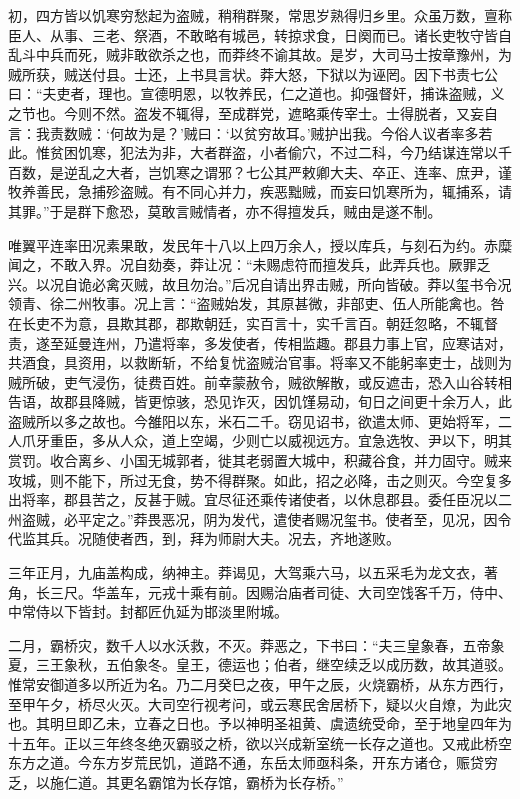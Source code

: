 \documentclass[12pt,UTF8]{ctexbook}
\begin{document}
初，四方皆以饥寒穷愁起为盗贼，稍稍群聚，常思岁熟得归乡里。众虽万数，亶称臣人、从事、三老、祭酒，不敢略有城邑，转掠求食，日阕而已。诸长吏牧守皆自乱斗中兵而死，贼非敢欲杀之也，而莽终不谕其故。是岁，大司马士按章豫州，为贼所获，贼送付县。士还，上书具言状。莽大怒，下狱以为诬罔。因下书责七公曰：“夫吏者，理也。宣德明恩，以牧养民，仁之道也。抑强督奸，捕诛盗贼，义之节也。今则不然。盗发不辄得，至成群党，遮略乘传宰士。士得脱者，又妄自言：我责数贼：‘何故为是？’贼曰：‘以贫穷故耳。’贼护出我。今俗人议者率多若此。惟贫困饥寒，犯法为非，大者群盗，小者偷穴，不过二科，今乃结谋连常以千百数，是逆乱之大者，岂饥寒之谓邪？七公其严敕卿大夫、卒正、连率、庶尹，谨牧养善民，急捕殄盗贼。有不同心并力，疾恶黜贼，而妄曰饥寒所为，辄捕系，请其罪。”于是群下愈恐，莫敢言贼情者，亦不得擅发兵，贼由是遂不制。



唯翼平连率田况素果敢，发民年十八以上四万余人，授以库兵，与刻石为约。赤糜闻之，不敢入界。况自劾奏，莽让况：“未赐虑符而擅发兵，此弄兵也。厥罪乏兴。以况自诡必禽灭贼，故且勿治。”后况自请出界击贼，所向皆破。莽以玺书令况领青、徐二州牧事。况上言：“盗贼始发，其原甚微，非部吏、伍人所能禽也。咎在长吏不为意，县欺其郡，郡欺朝廷，实百言十，实千言百。朝廷忽略，不辄督责，遂至延曼连州，乃遣将率，多发使者，传相监趣。郡县力事上官，应寒诘对，共酒食，具资用，以救断斩，不给复忧盗贼治官事。将率又不能躬率吏士，战则为贼所破，吏气浸伤，徒费百姓。前幸蒙赦令，贼欲解散，或反遮击，恐入山谷转相告语，故郡县降贼，皆更惊骇，恐见诈灭，因饥馑易动，旬日之间更十余万人，此盗贼所以多之故也。今雒阳以东，米石二千。窃见诏书，欲遣太师、更始将军，二人爪牙重臣，多从人众，道上空竭，少则亡以威视远方。宜急选牧、尹以下，明其赏罚。收合离乡、小国无城郭者，徙其老弱置大城中，积藏谷食，并力固守。贼来攻城，则不能下，所过无食，势不得群聚。如此，招之必降，击之则灭。今空复多出将率，郡县苦之，反甚于贼。宜尽征还乘传诸使者，以休息郡县。委任臣况以二州盗贼，必平定之。”莽畏恶况，阴为发代，遣使者赐况玺书。使者至，见况，因令代监其兵。况随使者西，到，拜为师尉大夫。况去，齐地遂败。



三年正月，九庙盖构成，纳神主。莽谒见，大驾乘六马，以五采毛为龙文衣，著角，长三尺。华盖车，元戎十乘有前。因赐治庙者司徒、大司空饯客千万，侍中、中常侍以下皆封。封都匠仇延为邯淡里附城。



二月，霸桥灾，数千人以水沃救，不灭。莽恶之，下书曰：“夫三皇象春，五帝象夏，三王象秋，五伯象冬。皇王，德运也；伯者，继空续乏以成历数，故其道驳。惟常安御道多以所近为名。乃二月癸巳之夜，甲午之辰，火烧霸桥，从东方西行，至甲午夕，桥尽火灭。大司空行视考问，或云寒民舍居桥下，疑以火自燎，为此灾也。其明旦即乙未，立春之日也。予以神明圣祖黄、虞遗统受命，至于地皇四年为十五年。正以三年终冬绝灭霸驳之桥，欲以兴成新室统一长存之道也。又戒此桥空东方之道。今东方岁荒民饥，道路不通，东岳太师亟科条，开东方诸仓，赈贷穷乏，以施仁道。其更名霸馆为长存馆，霸桥为长存桥。”
\end{document}
